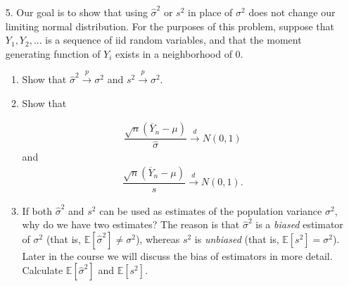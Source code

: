 \documentclass[11pt]{article}
\begin{document}
\begin{enumerate}
\item[5.] Our goal is to show that using $\widehat{\sigma}^2$ or $s^2$ in place of $\sigma^2$ does not change our limiting normal distribution. For the purposes of this problem, suppose that $Y_1, Y_2,...$ is a sequence of iid random variables, and that the moment generating function of $Y_i$ exists in a neighborhood of 0.

\begin{enumerate}
\item Show that $\widehat{\sigma}^2 \overset{p}{\to} \sigma^2$ and $s^2 \overset{p}{\to} \sigma^2$.

\item Show that

\begin{align*}
\dfrac{\sqrt{n}(\overline{Y}_n - \mu)}{\widehat{\sigma}} \overset{d}{\to} N(0, 1)
\end{align*}
and
\begin{align*}
\dfrac{\sqrt{n}(\overline{Y}_n - \mu)}{s} \overset{d}{\to} N(0, 1).
\end{align*}

\item If both $\widehat{\sigma}^2$ and $s^2$ can be used as estimates of the population variance $\sigma^2$, why do we have two estimates? The reason is that $\widehat{\sigma}^2$ is a \textit{biased} estimator of $\sigma^2$ (that is, $\mathbb{E}[\widehat{\sigma}^2] \neq \sigma^2$), whereas $s^2$ is \textit{unbiased} (that is, $\mathbb{E}[s^2] = \sigma^2$). Later in the course we will discuss the bias of estimators in more detail.\\

Calculate $\mathbb{E}[\widehat{\sigma}^2]$ and $\mathbb{E}[s^2]$.
\end{enumerate}
\end{enumerate}
\end{document}
